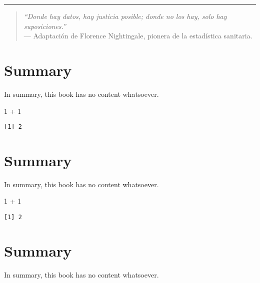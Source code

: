 \documentclass[
  letterpaper,
  DIV=11,
  numbers=noendperiod]{scrreprt}
\newenvironment{Shaded}{\begin{snugshade}}{\end{snugshade}}
\newcommand{\DecValTok}[1]{\textcolor[rgb]{0.68,0.00,0.00}{#1}}
\newcommand{\SpecialCharTok}[1]{\textcolor[rgb]{0.37,0.37,0.37}{#1}}
\begin{document}
\begin{center}\rule{0.5\linewidth}{0.5pt}\end{center}

\begin{quote}
\emph{``Donde hay datos, hay justicia posible; donde no los hay, solo
hay suposiciones.''}\\
--- Adaptación de Florence Nightingale, pionera de la estadística
sanitaria.
\end{quote}


\chapter{Summary}\label{summary}

In summary, this book has no content whatsoever.

\begin{Shaded}
\begin{Highlighting}[]
\DecValTok{1} \SpecialCharTok{+} \DecValTok{1}
\end{Highlighting}
\end{Shaded}

\begin{verbatim}
[1] 2
\end{verbatim}


\chapter{Summary}\label{summary-1}

In summary, this book has no content whatsoever.

\begin{Shaded}
\begin{Highlighting}[]
\DecValTok{1} \SpecialCharTok{+} \DecValTok{1}
\end{Highlighting}
\end{Shaded}

\begin{verbatim}
[1] 2
\end{verbatim}


\chapter{Summary}\label{summary-2}

In summary, this book has no content whatsoever.
\end{document}
